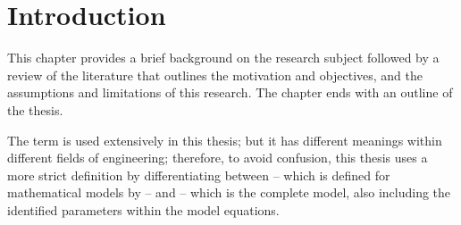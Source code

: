 \chapter{Introduction}
This chapter provides a brief background on the research subject followed by a review of the literature that outlines the motivation and objectives, and the assumptions and limitations of this research. The chapter ends with an outline of the thesis.

The term  is used extensively in this thesis; but it has different meanings within different fields of engineering; therefore, to avoid confusion, this thesis uses a more strict definition by differentiating between  -- which is defined for mathematical models by  -- and  -- which is the complete model, also including the identified parameters within the model equations. 







